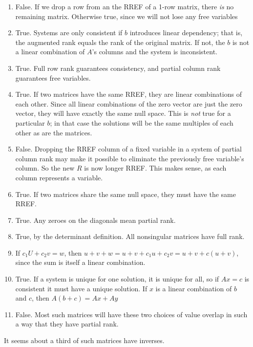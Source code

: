 \documentclass[]{article}
\begin{document}
\begin{enumerate}
\def\labelenumi{\arabic{enumi}.}
\setcounter{enumi}{39}
\item
  False. If we drop a row from an the RREF of a 1-row matrix, there
  \emph{is} no remaining matrix. Otherwise true, since we will not lose
  any free variables
\item
  True. Systems are only consistent if \(b\) introduces linear
  dependency; that is, the augmented rank equals the rank of the
  original matrix. If not, the \(b\) is not a linear combination of
  \(A\)'s columns and the system is inconsistent.
\item
  True. Full row rank guarantees consistency, and partial column rank
  guarantees free variables.
\item
  True. If two matrices have the same RREF, they are linear combinations
  of each other. Since all linear combinations of the zero vector are
  just the zero vector, they will have exactly the same null space. This
  is \emph{not} true for a particular \(b\); in that case the solutions
  will be the same multiples of each other as are the matrices.
\item
  False. Dropping the RREF column of a fixed variable in a system of
  partial column rank may make it possible to eliminate the previously
  free variable's column. So the new \(R\) is now longer RREF. This
  makes sense, as each column represents a variable.
\item
  True. If two matrices share the same null space, they must have the
  same RREF.
\item
  True. Any zeroes on the diagonals mean partial rank.
\item
  True, by the determinant definition. All nonsingular matrices have
  full rank.
\item
  If \(c_1U+c_2v=w\), then \(u+v+w=u+v+c_1u+c_2v=u+v+c(u+v)\), since the
  sum is itself a linear combination.
\item
  True. If a system is unique for one solution, it is unique for all, so
  if \(Ax=c\) is consistent it must have a unique solution. If \(x\) is
  a linear combination of \(b\) and \(c\), then \(A(b+c)= Ax + Ay\)
\item
  False. Most such matrices will have these two choices of value overlap
  in such a way that they have partial rank.
\end{enumerate}

It seems about a third of such matrices have inverses.
\end{document}
